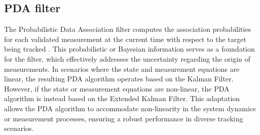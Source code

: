\subsection{PDA filter}
\label{sec:pda_filter}
The Probabilistic Data Association filter computes the association probabilities for each validated measurement at
the current time with respect to the target being tracked \cite{BarShalomPDA}. This probabilistic or Bayesian information serves as a
foundation for the filter, which effectively addresses the uncertainty regarding the origin of measurements. In
scenarios where the state and measurement equations are linear, the resulting PDA algorithm operates based on the Kalman Filter. However, if the state or measurement equations are non-linear, the PDA algorithm is instead based on the Extended Kalman Filter. This adaptation allows the PDA algorithm to accommodate non-linearity in the system dynamics or measurement processes, ensuring a robust performance in diverse tracking scenarios.

